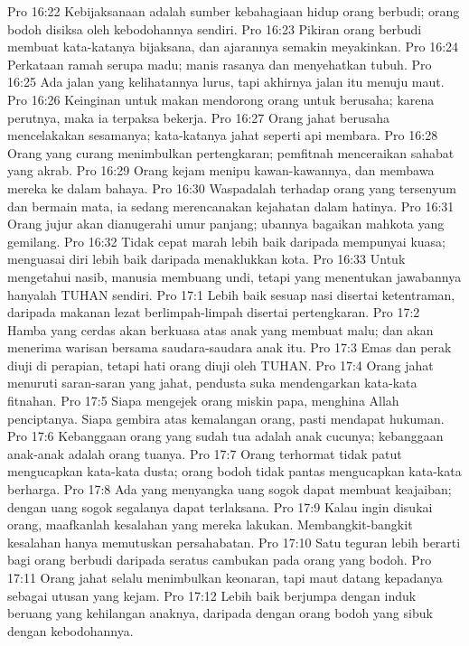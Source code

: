 Pro 16:22  Kebijaksanaan adalah sumber kebahagiaan hidup orang berbudi; orang bodoh disiksa oleh kebodohannya sendiri.
Pro 16:23  Pikiran orang berbudi membuat kata-katanya bijaksana, dan ajarannya semakin meyakinkan.
Pro 16:24  Perkataan ramah serupa madu; manis rasanya dan menyehatkan tubuh.
Pro 16:25  Ada jalan yang kelihatannya lurus, tapi akhirnya jalan itu menuju maut.
Pro 16:26  Keinginan untuk makan mendorong orang untuk berusaha; karena perutnya, maka ia terpaksa bekerja.
Pro 16:27  Orang jahat berusaha mencelakakan sesamanya; kata-katanya jahat seperti api membara.
Pro 16:28  Orang yang curang menimbulkan pertengkaran; pemfitnah menceraikan sahabat yang akrab.
Pro 16:29  Orang kejam menipu kawan-kawannya, dan membawa mereka ke dalam bahaya.
Pro 16:30  Waspadalah terhadap orang yang tersenyum dan bermain mata, ia sedang merencanakan kejahatan dalam hatinya.
Pro 16:31  Orang jujur akan dianugerahi umur panjang; ubannya bagaikan mahkota yang gemilang.
Pro 16:32  Tidak cepat marah lebih baik daripada mempunyai kuasa; menguasai diri lebih baik daripada menaklukkan kota.
Pro 16:33  Untuk mengetahui nasib, manusia membuang undi, tetapi yang menentukan jawabannya hanyalah TUHAN sendiri.
Pro 17:1  Lebih baik sesuap nasi disertai ketentraman, daripada makanan lezat berlimpah-limpah disertai pertengkaran.
Pro 17:2  Hamba yang cerdas akan berkuasa atas anak yang membuat malu; dan akan menerima warisan bersama saudara-saudara anak itu.
Pro 17:3  Emas dan perak diuji di perapian, tetapi hati orang diuji oleh TUHAN.
Pro 17:4  Orang jahat menuruti saran-saran yang jahat, pendusta suka mendengarkan kata-kata fitnahan.
Pro 17:5  Siapa mengejek orang miskin papa, menghina Allah penciptanya. Siapa gembira atas kemalangan orang, pasti mendapat hukuman.
Pro 17:6  Kebanggaan orang yang sudah tua adalah anak cucunya; kebanggaan anak-anak adalah orang tuanya.
Pro 17:7  Orang terhormat tidak patut mengucapkan kata-kata dusta; orang bodoh tidak pantas mengucapkan kata-kata berharga.
Pro 17:8  Ada yang menyangka uang sogok dapat membuat keajaiban; dengan uang sogok segalanya dapat terlaksana.
Pro 17:9  Kalau ingin disukai orang, maafkanlah kesalahan yang mereka lakukan. Membangkit-bangkit kesalahan hanya memutuskan persahabatan.
Pro 17:10  Satu teguran lebih berarti bagi orang berbudi daripada seratus cambukan pada orang yang bodoh.
Pro 17:11  Orang jahat selalu menimbulkan keonaran, tapi maut datang kepadanya sebagai utusan yang kejam.
Pro 17:12  Lebih baik berjumpa dengan induk beruang yang kehilangan anaknya, daripada dengan orang bodoh yang sibuk dengan kebodohannya.
